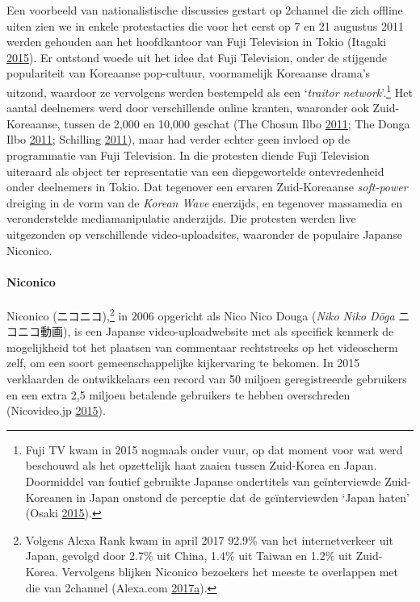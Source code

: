 \documentclass[10.5pt,dutch,]{article}
\let\oldparagraph\paragraph
\renewcommand{\paragraph}[1]{\oldparagraph{#1}\mbox{}}
\begin{document}
Een voorbeeld van nationalistische discussies gestart op 2channel die
zich offline uiten zien we in enkele protestacties die voor het eerst op
7 en 21 augustus 2011 werden gehouden aan het hoofdkantoor van Fuji
Television in Tokio (Itagaki
\protect\hyperlink{ref-itagakiux5fanatomyux5f2015}{2015}). Er ontstond
woede uit het idee dat Fuji Television, onder de stijgende populariteit
van Koreaanse pop-cultuur, voornamelijk Koreaanse drama's uitzond,
waardoor ze vervolgens werden bestempeld als een `\emph{traitor
network}'.\footnote{Fuji TV kwam in 2015 nogmaals onder vuur, op dat
  moment voor wat werd beschouwd als het opzettelijk haat zaaien tussen
  Zuid-Korea en Japan. Doormiddel van foutief gebruikte Japanse
  ondertitels van geïnterviewde Zuid-Koreanen in Japan onstond de
  perceptie dat de geïnterviewden `Japan haten' (Osaki
  \protect\hyperlink{ref-osakiux5ffujiux5f2015}{2015}).} Het aantal
deelnemers werd door verschillende online kranten, waaronder ook
Zuid-Koreaanse, tussen de 2,000 en 10,000 geschat (The Chosun Ilbo
\protect\hyperlink{ref-theux5fchosunux5filboux5fjapaneseux5f2011}{2011};
The Donga Ilbo
\protect\hyperlink{ref-theux5fdongaux5filboux5fjapansux5f2011}{2011};
Schilling \protect\hyperlink{ref-schillingux5fjapaneseux5f2011}{2011}),
maar had verder echter geen invloed op de programmatie van Fuji
Television. In die protesten diende Fuji Television uiteraard als object
ter representatie van een diepgewortelde ontevredenheid onder deelnemers
in Tokio. Dat tegenover een ervaren Zuid-Koreaanse \emph{soft-power}
dreiging in de vorm van de \emph{Korean Wave} enerzijds, en tegenover
massamedia en veronderstelde mediamanipulatie anderzijds. Die protesten
werden live uitgezonden op verschillende video-uploadsites, waaronder de
populaire Japanse Niconico.

\paragraph{Niconico}\label{niconico}

Niconico (ニコニコ),\footnote{Volgens Alexa Rank kwam in april 2017
  92.9\% van het internetverkeer uit Japan, gevolgd door 2.7\% uit
  China, 1.4\% uit Taiwan en 1.2\% uit Zuid-Korea. Vervolgens blijken
  Niconico bezoekers het meeste te overlappen met die van 2channel
  (Alexa.com
  \protect\hyperlink{ref-alexa.comux5fnicovideo.jpux5f2017}{2017}\protect\hyperlink{ref-alexa.comux5fnicovideo.jpux5f2017}{a}).}
in 2006 opgericht als Nico Nico Douga (\emph{Niko Niko Dōga}
ニコニコ動画), is een Japanse video-uploadwebsite met als specifiek
kenmerk de mogelijkheid tot het plaatsen van commentaar rechtstreeks op
het videoscherm zelf, om een soort gemeenschappelijke kijkervaring te
bekomen. In 2015 verklaarden de ontwikkelaars een record van 50 miljoen
geregistreerde gebruikers en een extra 2,5 miljoen betalende gebruikers
te hebben overschreden (Nicovideo.jp
\protect\hyperlink{ref-nicovideo.jpux5fpuremiamuux5f2015}{2015}).
\end{document}
